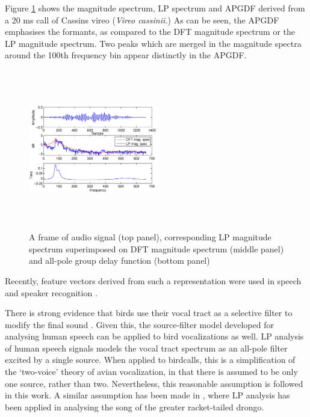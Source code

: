 \documentclass[a4paper]{article}
\begin{document}
Figure \ref{fig:all-pole} shows the magnitude spectrum, LP
spectrum and APGDF derived from a 20 ms call of Cassins vireo (\textit{Vireo
cassinii.}) As can be seen, the APGDF emphasises the formants, as compared to the
DFT magnitude spectrum or the LP magnitude spectrum. Two peaks which are merged
in the magnitude spectra around the 100th frequency bin appear distinctly in the
APGDF.

\begin{figure}[h]

\includegraphics[width=0.5\textwidth,height=7cm]
{apgd.eps}
\caption{ A frame of audio signal (top panel), corresponding LP
magnitude spectrum superimposed on DFT magnitude spectrum (middle panel) and
all-pole group delay function (bottom panel)  }
\label{fig:all-pole}
\end{figure}


Recently, feature vectors
derived from such a representation were used in speech \cite{drugman} and speaker
recognition \cite{padman}. 


There is strong evidence that birds use their vocal tract as a selective filter
to modify the final sound \cite{catchpole}.  Given this, the source-filter model
developed for analysing human speech can be applied to bird vocalizations as
well.  LP analysis of human speech signals models the vocal
tract spectrum as an all-pole filter \cite{makhoul} excited by a single source.
When applied to birdcalls, this is a simplification of the `two-voice' theory of
avian vocalization\cite{catchpole}, in that there is assumed to be only one
source, rather than two. Nevertheless, this reasonable assumption is followed in
this work. A similar assumption has been made in \cite{agnihotri}, where LP
analysis has been applied in analysing the song of the greater racket-tailed
drongo.


\end{document}
